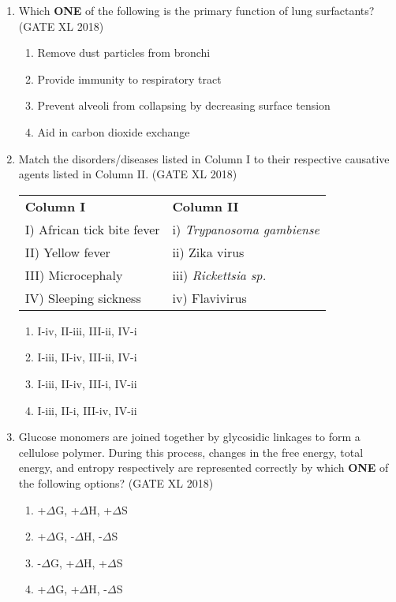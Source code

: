 \documentclass[14pt]{extarticle}
\begin{document}
\begin{flushleft}
\begin{enumerate}
    \item Which \textbf{ONE} of the following is the primary function of lung surfactants?\\
    \hfill(GATE XL 2018)\\
    \begin{enumerate}
        \item Remove dust particles from bronchi
        \item Provide immunity to respiratory tract
        \item Prevent alveoli from collapsing by decreasing surface tension
        \item Aid in carbon dioxide exchange
    \end{enumerate}

    \item Match the disorders/diseases listed in Column I to their respective causative agents listed in Column II. \hfill(GATE XL 2018)\\
\begin{tabular}{p{6cm} p{6cm}}
\textbf{Column I} & \textbf{Column II} \\
I) African tick bite fever & i) \textit{Trypanosoma gambiense} \\
II) Yellow fever & ii) Zika virus \\
III) Microcephaly & iii) \textit{Rickettsia sp.} \\
IV) Sleeping sickness & iv) Flavivirus \\
\end{tabular}

\begin{multicols}{2}
 \begin{enumerate}
        \item I-iv, II-iii, III-ii, IV-i
        \item I-iii, II-iv, III-ii, IV-i
        \item I-iii, II-iv, III-i, IV-ii
        \item I-iii, II-i, III-iv, IV-ii
    \end{enumerate}
    \end{multicols}

    \item Glucose monomers are joined together by glycosidic linkages to form a cellulose polymer. During this process, changes in the free energy, total energy, and entropy respectively are represented correctly by which \textbf{ONE} of the following options? \hfill(GATE XL 2018)\\
    \begin{multicols}{2}
    \begin{enumerate}
        \item +$\Delta$G, +$\Delta$H, +$\Delta$S
        \item +$\Delta$G, -$\Delta$H, -$\Delta$S
        \item -$\Delta$G, +$\Delta$H, +$\Delta$S
        \item +$\Delta$G, +$\Delta$H, -$\Delta$S
    \end{enumerate}
    \end{multicols}


\end{enumerate}
\end{flushleft}
\end{document}
